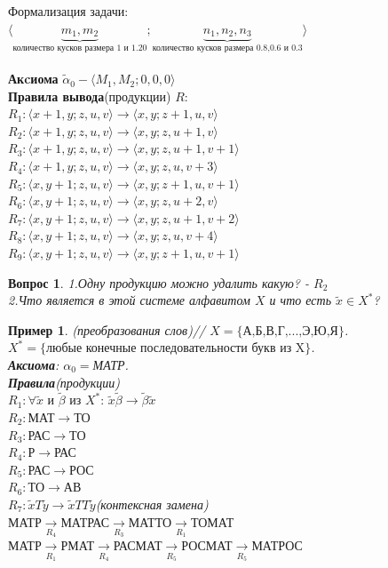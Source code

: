 \documentclass{article}
\newtheorem{example}{Пример}
\newtheorem{question}{Вопрос}
\numberwithin{example}{section}
\numberwithin{question}{section}
\numberwithin{Remark}{section}
\numberwithin{theorem}{section}
\numberwithin{definition}{section}
\numberwithin{proposition}{section}
\begin{document}
Формализация задачи:\\
$\langle \underbrace{m_1,m_2}_{\text{количество кусков размера 1 и 1.20}};\underbrace{n_1,n_2,n_3}_{\text{количество кусков размера 0.8,0.6 и 0.3}}\rangle $\\
\\
\textbf{Акcиома} $\tilde{\alpha}_0 - \langle  M_1,M_2;0,0,0\rangle $\\
\textbf{Правила вывода}(продукции) $R$:\\
$R_1: \langle x+1,y;z,u,v\rangle \to \langle x,y;z+1,u,v\rangle $\\
$R_2: \langle x+1,y;z,u,v\rangle \to \langle x,y;z,u+1,v\rangle $\\
$R_3: \langle x+1,y;z,u,v\rangle \to \langle x,y;z,u+1,v+1\rangle $\\
$R_4: \langle x+1,y;z,u,v\rangle \to \langle x,y;z,u,v+3\rangle $\\
$R_5: \langle x,y+1;z,u,v\rangle \to \langle x,y;z+1,u,v+1\rangle $\\
$R_6: \langle x,y+1;z,u,v\rangle \to \langle x,y;z,u+2,v\rangle $\\
$R_7: \langle x,y+1;z,u,v\rangle \to \langle x,y;z,u+1,v+2\rangle $\\
$R_8: \langle x,y+1;z,u,v\rangle \to \langle x,y;z,u,v+4\rangle $\\
$R_9: \langle x,y+1;z,u,v\rangle \to \langle x,y;z+1,u,v+1\rangle $
\begin{question}
1.Одну продукцию можно удалить какую? - $R_2$\\
2.Что является в этой системе алфавитом $X$ и что есть $\widetilde{x}\in X^*$?
\end{question}
\begin{example}
	(преобразования слов)//
	$X=\{\text{А,Б,В,Г,...,Э,Ю,Я}\}$.\\
	$X^*=\{\text{любые конечные последовательности букв из X}\}$.\\
	\textbf{Аксиома}: $\alpha_0=$МАТР.\\
	\textbf{Правила}(продукции)\\
	$R_1: \forall \widetilde{x}\text{ и }\widetilde{\beta}\text{ из }X^*:\, \widetilde{x}\widetilde{\beta}\to\widetilde{\beta}\widetilde{x}$\\
	$R_2: \text{МАТ}\to\text{ТО}$\\
	$R_3: \text{РАС}\to\text{ТО}$\\
	$R_4: \text{Р}\to\text{РАС}$\\
	$R_5: \text{РАС}\to\text{РОС}$\\
	$R_6: \text{ТО}\to\text{АВ}$\\
	$R_7: \widetilde{x}T\widetilde{y}\to\widetilde{x}TT\widetilde{y}$(контексная замена)\\
	$\text{МАТР}\xrightarrow[R_4]{}\text{МАТРАС}\xrightarrow[R_3]{}\text{МАТТО}\xrightarrow[R_1]{}\text{ТОМАТ}$\\
	$\text{МАТР}\xrightarrow[R_1]{}\text{РМАТ}\xrightarrow[R_4]{}\text{РАСМАТ}\xrightarrow[R_5]{}\text{РОСМАТ}\xrightarrow[R_5]{}\text{МАТРОС}$
\end{example}
\end{document}

